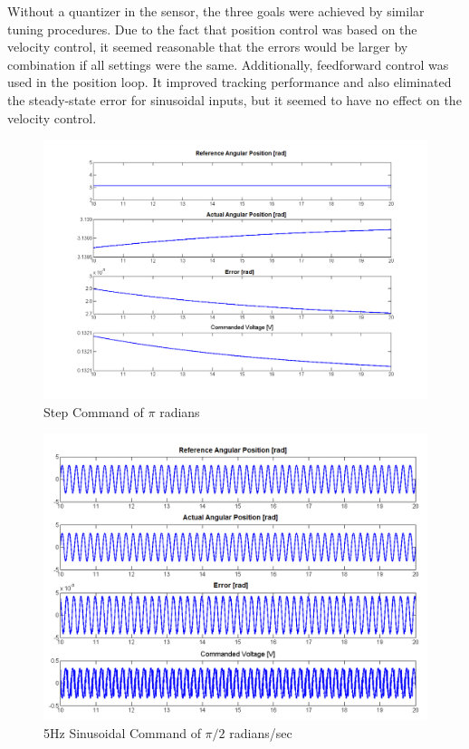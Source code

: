 \documentclass{article}
\theoremstyle{plain}
\theoremstyle{definition}
\theoremstyle{remark}
\begin{document}
Without a quantizer in the sensor, the three goals were achieved by similar tuning procedures. Due to the fact that position control was based on the velocity control, it seemed reasonable that the errors would be larger by combination if all settings were the same. Additionally, feedforward control was used in the position loop. It improved tracking performance and also eliminated the steady-state error for sinusoidal inputs, but it seemed to have no effect on the velocity control.  

\begin{figure}[htb]
\begin{center}
\includegraphics[width = 13 cm]{q3_18}
\caption{Step Command of $\pi$ radians}
\label{q3_18}
\end{center}
\end{figure}

\begin{figure}[htb]
\begin{center}
\includegraphics[width = 13 cm]{q3_19}
\caption{5Hz Sinusoidal Command of $\pi/2$ radians/sec}
\label{q3_19}
\end{center}
\end{figure}
\end{document}
